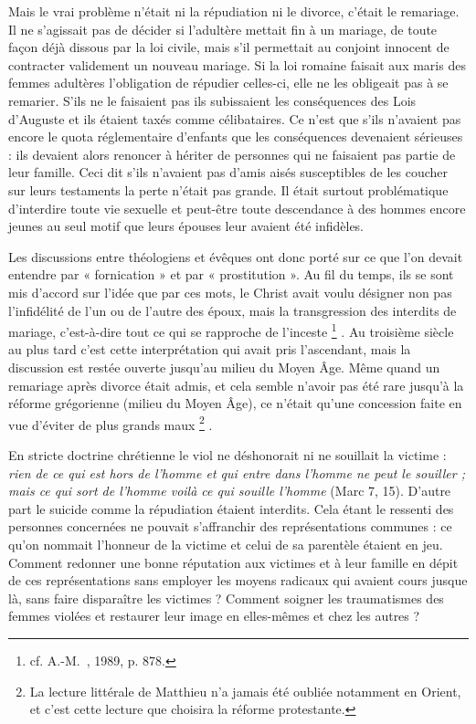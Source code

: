 Mais le vrai problème n'était ni la répudiation ni le divorce, c'était le remariage. Il ne s'agissait pas de décider si l'adultère mettait fin à un mariage, de toute façon déjà dissous par la loi civile, mais s'il permettait au conjoint innocent de contracter validement un nouveau mariage. Si la loi romaine faisait aux maris des femmes adultères l'obligation de répudier celles-ci, elle ne les obligeait pas à se remarier. S'ils ne le faisaient pas ils subissaient les conséquences des Lois d'Auguste et ils étaient taxés comme célibataires. Ce n'est que s'ils n'avaient pas encore le quota réglementaire d'enfants que les conséquences devenaient sérieuses : ils devaient alors renoncer à hériter de personnes qui ne faisaient pas partie de leur famille. Ceci dit s'ils n'avaient pas d'amis aisés susceptibles de les coucher sur leurs testaments la perte n'était pas grande. Il était surtout problématique d'interdire toute vie sexuelle et peut-être toute descendance à des hommes encore jeunes au seul motif que leurs épouses leur avaient été infidèles. 

 Les discussions entre théologiens et évêques ont donc porté sur ce que l'on devait entendre par « fornication » et par « prostitution ». Au fil du temps, ils se sont mis d'accord sur l'idée que par ces mots, le Christ avait voulu désigner non pas l'infidélité de l'un ou de l'autre des époux, mais la transgression des interdits de mariage, c'est-à-dire tout ce qui se rapproche de l'inceste%
\footnote{cf. A.-M.~, 1989, p. 878.}%
. Au troisième siècle au plus tard c'est cette interprétation qui avait pris l'ascendant, mais la discussion est restée ouverte jusqu'au milieu du Moyen Âge. Même quand un remariage après divorce était admis, et cela semble n'avoir pas été rare jusqu'à la réforme grégorienne (milieu du Moyen Âge), ce n'était qu'une concession faite en vue d'éviter de plus grands maux%
\footnote{La lecture littérale de Matthieu n'a jamais été oubliée notamment en Orient, et c'est cette lecture que choisira la réforme protestante.}%
.

 En stricte doctrine chrétienne le viol ne déshonorait ni ne souillait la victime : \emph{rien de ce qui est hors de l'homme et qui entre dans l'homme ne peut le souiller ; mais ce qui sort de l'homme voilà ce qui souille l'homme} (Marc 7, 15). D'autre part le suicide comme la répudiation étaient interdits. Cela étant le ressenti des personnes concernées ne pouvait s'affranchir des représentations communes : ce qu'on nommait l'honneur de la victime et celui de sa parentèle étaient en jeu. Comment redonner une bonne réputation aux victimes et à leur famille en dépit de ces représentations sans employer les moyens radicaux qui avaient cours jusque là, sans faire disparaître les victimes ? Comment soigner les traumatismes des femmes violées et restaurer leur image en elles-mêmes et chez les autres ?  

